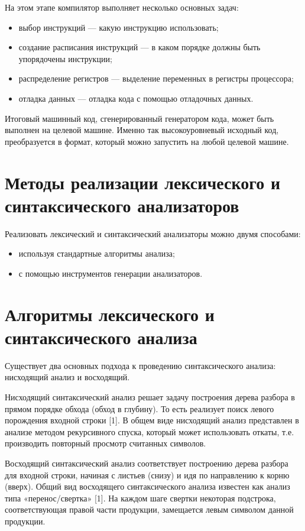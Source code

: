 На этом этапе компилятор выполняет несколько основных задач:
\begin{itemize}
	\item выбор инструкций — какую инструкцию использовать;
	\item создание расписания инструкций — в каком порядке должны быть упорядочены инструкции;
	\item распределение регистров — выделение переменных в регистры процессора;
	\item отладка данных — отладка кода с помощью отладочных данных.
\end{itemize}

Итоговый машинный код, сгенерированный генератором кода, может быть выполнен на целевой машине.
Именно так высокоуровневый исходный код, преобразуется в формат, который можно запустить на любой целевой машине.

\section{Методы реализации лексического и синтаксического анализаторов}

Реализовать лексический и синтаксический анализаторы можно двумя
способами:
\begin{itemize}
	\item используя стандартные алгоритмы анализа;
	\item с помощью инструментов генерации анализаторов.
\end{itemize}

\section{Алгоритмы лексического и синтаксического анализа}

Существует два основных подхода к проведению синтаксического анализа: нисходящий анализ и восходящий.

Нисходящий синтаксический анализ решает задачу построения дерева разбора в прямом порядке обхода (обход в глубину).
То есть реализует поиск левого порождения входной строки [1].
В общем виде нисходящий анализ представлен в анализе методом рекурсивного спуска, который может использовать откаты, т.е. производить повторный просмотр считанных символов.

Восходящий синтаксический анализ соответствует построению дерева разбора для входной строки, начиная с листьев (снизу) и идя по направлению к корню (вверх).
Общий вид восходящего синтаксического анализа известен как анализ типа «перенос/свертка» [1].
На каждом шаге свертки некоторая подстрока, соответствующая правой части продукции, замещается левым символом данной продукции.

